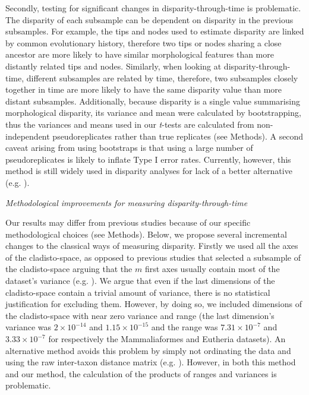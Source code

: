 \documentclass[12pt,letterpaper]{article}
\renewcommand{\subsection}[1]{%
\bigskip
\begin{center}
\begin{large}
\normalfont\itshape #1
\end{large}
\end{center}}
\begin{document}
Secondly, testing for significant changes in disparity-through-time is problematic.
The disparity of each subsample can be dependent on disparity in the previous subsamples.
For example, the tips and nodes used to estimate disparity are linked by common evolutionary history, therefore two tips or nodes sharing a close ancestor are more likely to have similar morphological features than more distantly related tips and nodes.
Similarly, when looking at disparity-through-time, different subsamples are related by time, therefore, two subsamples closely together in time are more likely to have the same disparity value than more distant subsamples.
Additionally, because disparity is a single value summarising morphological disparity, its variance and mean were calculated by bootstrapping, thus the variances and means used in our \textit{t}-tests are calculated from non-independent pseudoreplicates rather than true replicates (see Methods).
A second caveat arising from using bootstraps is that using a large number of pseudoreplicates is likely to inflate Type I error rates. 
Currently, however, this method is still widely used in disparity analyses for lack of a better alternative (e.g. \cite{anderson2012using,zelditch2012geometric,smith2014joined}).

\subsection{Methodological improvements for measuring disparity-through-time}
Our results may differ from previous studies because of our specific methodological choices (see Methods).
Below, we propose several incremental changes to the classical ways of measuring disparity.
Firstly we used all the axes of the cladisto-space, as opposed to previous studies that selected a subsample of the cladisto-space arguing that the $m$ first axes usually contain most of the dataset's variance (e.g. \cite{brusatte50,anderson2012using}).
We argue that even if the last dimensions of the cladisto-space contain a trivial amount of variance, there is no statistical justification for excluding them.
However, by doing so, we included dimensions of the cladisto-space with near zero variance and range (the last dimension's variance was $2\times10^{-14}$ and $1.15\times10^{-15}$ and the range was $7.31\times10^{-7}$ and $3.33\times10^{-7}$ for respectively the Mammaliaformes and Eutheria datasets).
An alternative method avoids this problem by simply not ordinating the data and using the raw inter-taxon distance matrix (e.g. \cite{bensonfaunal2014,Close2015}). 
However, in both this method and our method, the calculation of the products of ranges and variances is problematic.
\end{document}

